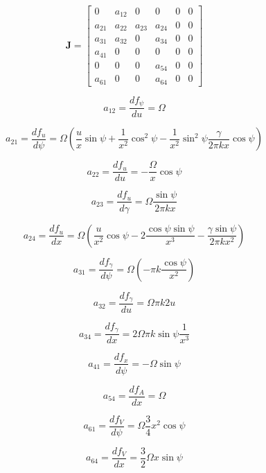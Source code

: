 \documentclass[12pt]{article}
\begin{document}
$$\mathbf{J} =%
\begin{bmatrix}
    0 & a_{12} & 0 & 0 & 0 & 0 \\[1ex]
    a_{21} & a_{22} & a_{23} & a_{24} & 0  & 0 \\[1ex]
    a_{31} & a_{32}& 0 & a_{34} & 0 & 0 \\[1ex]
    a_{41} & 0 & 0 & 0 & 0  & 0 \\[1ex]    
    0 & 0 & 0 &a_{54} & 0 & 0 \\[1ex]
    a_{61} & 0 & 0 & a_{64} & 0  & 0
  \end{bmatrix}
$$

$$
a_{12} = \frac{df_{\psi}}{du} = \Omega
$$

$$
a_{21} = \frac{df_{u}}{d\psi} = \Omega (\frac{u}{x} \sin \psi + \frac{1}{x^2} \cos^2 \psi - \frac{1}{x^2} \sin^2 \psi \frac{\gamma}{2 \pi k x } \cos \psi)
$$

$$
a_{22} = \frac{df_{u}}{du} = - \frac{\Omega}{x} \cos \psi
$$

$$
a_{23} = \frac{df_{u}}{d\gamma} = \Omega \frac{\sin \psi}{2 \pi k x}
$$

$$
a_{24} = \frac{df_{u}}{dx} = \Omega(\frac{u}{x^2}\cos \psi - 2\frac{\cos \psi \sin \psi}{x^3} - \frac{\gamma \sin \psi}{2 \pi k x^2})
$$

$$
a_{31} = \frac{df_{\gamma}}{d\psi} = \Omega (- \pi k \frac{\cos \psi}{x^2})
$$

$$
a_{32} = \frac{df_{\gamma}}{du} = \Omega \pi k 2 u
$$

$$
a_{34} = \frac{df_{\gamma}}{dx} = 2 \Omega \pi k \sin\psi \frac{1}{x^3}
$$

$$
a_{41} = \frac{df_{x}}{d\psi} = - \Omega \sin \psi
$$

$$
a_{54} = \frac{df_{A}}{dx} = \Omega
$$

$$
a_{61} = \frac{df_{V}}{d\psi} = \Omega \frac{3}{4} x^2 \cos \psi
$$

$$
a_{64} = \frac{df_{V}}{dx} = \frac{3}{2}\Omega x \sin \psi 
$$






\end{document}

